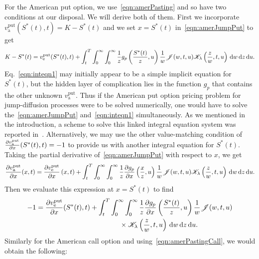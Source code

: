         	For the American put option, we use~\eqref{eqn:amerPasting} and so have two conditions at our disposal. We will derive both of them. First we incorporate $v_{\text{a}}^{\text{put}}(S^*(t),t) = K - S^*(t)$ and we set $x = S^*(t)$ in~\eqref{eqn:amerJumpPut} to get
        	\begin{equation}
        		\label{eqn:inteqn1}
        		\begin{split}
        		K - S^*(t) = v_{\text{e}}^{\text{put}}(S^*(t),t) + \int_t^T \int_0^\infty \int_0^\infty \frac{1}{z}g_p\left(\frac{S^*(t)}{z},u\right) \frac{1}{w}\mathscr J(w,t,u)\mathscr K_\lambda\left( \frac{z}{w},t,u \right) \, \mathrm d w \, \mathrm d z \, \mathrm d u.
        		\end{split}
        	\end{equation}
        	Eq.~\eqref{eqn:inteqn1} may initially appear to be a simple implicit equation for $S^*(t)$, but the hidden layer of complication lies in the function $g_p$ that contains the other unknown $v_{\text{a}}^{\text{put}}$. Thus if the American put option pricing problem for jump-diffusion processes were to be solved numerically, one would have to solve the~\eqref{eqn:amerJumpPut} and~\eqref{eqn:inteqn1} simultaneously. As we mentioned in the introduction, a scheme to solve this linked integral equation system was reported in~\cite{Chiarella2006}. Alternatively, we may use the other value-matching condition of $\frac{\partial v_{\text{a}}^{\text{put}}}{\partial x}(S^*(t),t) = -1$ to provide us with another integral equation for $S^*(t)$. Taking the partial derivative of~\eqref{eqn:amerJumpPut} with respect to $x$, we get
        	$$
        		\frac{\partial v_{\text{a}}^{\text{put}}}{\partial x}( x, t) = \frac{\partial v_{\text{e}}^{\text{put}}}{\partial x}\left(x,t\right) + \int_t^T \int_0^\infty \int_0^\infty \frac{1}{z}\frac{\partial g_p}{\partial x}\left(\frac{x}{z},u\right) \frac{1}{w}\mathscr J(w,t,u)\mathscr K_\lambda\left( \frac{z}{w},t,u \right) \, \mathrm d w \, \mathrm d z \, \mathrm d u.
        	$$
Then we evaluate this expression at $x = S^*(t)$ to find
		\begin{equation}
			\label{eqn:inteqn2}
			\begin{split}
			-1 &=  \frac{\partial v_{\text{e}}^{\text{put}}}{\partial x}( S^*(t),t) + \int_t^T \int_0^\infty \int_0^\infty \frac{1}{z}\frac{\partial g_p}{\partial x}\left(\frac{ S^*(t)}{z},u\right) \frac{1}{w}\mathscr J(w,t,u) \\
			&\qquad\qquad\qquad\qquad\qquad\qquad \times \mathscr K_\lambda\left( \frac{z}{w},t,u \right) \, \mathrm d w \, \mathrm d z \, \mathrm d u.
			\end{split}
		\end{equation}
Similarly for the American call option and using~\eqref{eqn:amerPastingCall}, we would obtain the following:
